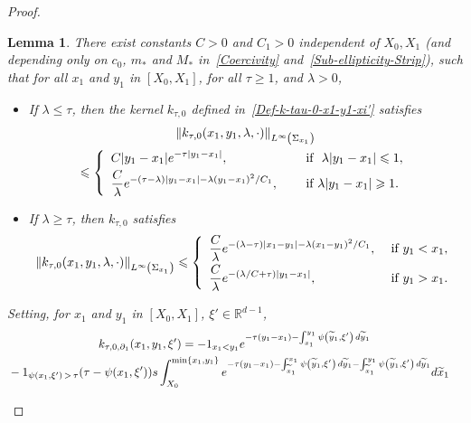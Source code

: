 \documentclass[10pt]{amsart}
\newtheorem{lemm}[theo]{Lemma}\newtheorem{prop}[theo]{Proposition}\newtheorem{coro}[theo]{Corollary}\newtheorem{conj}[theo]{Conjecture}
\theoremstyle{definition}\newtheorem{defi}[theo]{Definition}\newtheorem{rema}[theo]{Remark}\newtheorem{exam}[theo]{Example}\newtheorem{exem}[theo]{Example}\newtheorem{nota}[theo]{Notation}
\newcommand*\R{\mathbb{R}}
\newcommand*\ds{\displaystyle}
\renewcommand{\leq}{\leqslant}
\renewcommand{\geq}{\geqslant}
\renewcommand{\tilde}{\widetilde}
\let\oldtilde\tilde
\renewcommand*{\tilde}[1]{\mathchoice{\widetilde{#1}}{\widetilde{#1}}{\oldtilde{#1}}{\oldtilde{#1}}}
\begin{document}
\begin{proof}
\begin{lemm}\label{Lem-Est-k-0-x1-y1}
There exist constants $C>0$ and $C_1 >0$ independent of $X_0, X_1$ (and depending only on $c_0$, $m_*$ and $M_*$ in~\eqref{Coercivity} and~\eqref{Sub-ellipticity-Strip}), such that for all $x_1$ and $y_1$ in $[X_0, X_1]$, for all $\tau \geq 1$, and $\lambda >0$,
\begin{itemize}
\item If $\lambda \leq \tau$, then the kernel $k_{\tau,0}$ defined in~\eqref{Def-k-tau-0-x1-y1-xi'} satisfies
\begin{multline}\label{Est-k-tau-0-x1-y1-Low-Freq}
\| k_{\tau, 0}(x_1,y_1,\lambda, \cdot) \|_{L^\infty\left(\Sigma_{x_1}\right)}\\
\leq
\left\{
\begin{array}{ll}
\ds C | y_1- x_1 | e^{-\tau | y_1- x_1 | }, \quad & \text{ if } \ \lambda |y_1 -x_1| \leqslant 1,
\smallskip
\\
\ds \frac{C}{\lambda }e^{- (\tau - \lambda) |y_1- x_1| - \lambda (y_1- x_1) ^ 2/C_1}, \quad & \text{ if } \lambda |y_1 -x_1| \geqslant 1.
\end{array}
\right.
\end{multline}
\item If $\lambda \geq \tau$, then $k_{\tau,0}$ satisfies
\begin{equation}\label{Est-k-tau-0-x1-y1-High-Freq}
\| k_{\tau, 0}(x_1,y_1,\lambda, \cdot) \|_{L^\infty\left(\Sigma_{x_1}\right)}
\leq
\left\{
\begin{array}{ll}
\ds \frac{C}{\lambda} e^{-(\lambda-\tau) |x_1-y_1|- \lambda (x_1-y_1)^2/C_1}, & \text{ if } y_1<x_1,
\smallskip
\\
\ds \frac{C}{\lambda} e^{-(\lambda/C + \tau)|y_1 - x_1|}, & \text{ if } y_1>x_1.
\end{array}
\right.
\end{equation}
\end{itemize}
Setting, for $x_1$ and $y_1$ in $[X_0, X_1]$, $\xi' \in \R^{d-1}$,
\begin{multline}\label{Def-k-tau-0-d1}
k_{\tau,0,\partial_1} (x_1, y_1, \xi') = -1_{x_1 < y_1} e^{-\tau(y_1-x_1) - \int_{x_1}^{y_1} \psi\left(\tilde y_1, \xi'\right) \, d\tilde y_1}
\\
\begin{aligned}
& - 1_{\psi(x_1, \xi')\,>\,\tau} (\tau - \psi(x_1, \xi'))s
\int_{X_0}^{\min\{x_1,y_1\}} e^{-\tau(y_1-x_1) - \int_{\tilde x_1}^{x_1} \psi\left(\tilde y_1, \xi'\right) \, d\tilde y_1 - \int_{\tilde x_1}^{y_1} \psi\left(\tilde y_1, \xi'\right) \, d\tilde y_1} d\tilde x_1

\end{aligned}
\end{multline}
\end{lemm}
\end{proof}
\end{document}
